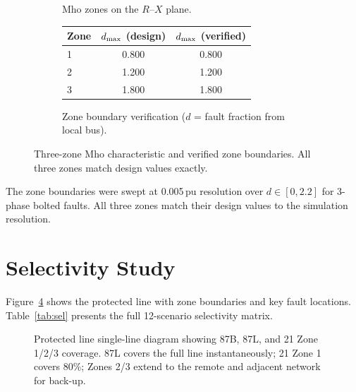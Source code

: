 \documentclass[11pt, a4paper]{article}
\begin{document}
\begin{figure}[ht]
  \centering
  \begin{subfigure}[b]{0.52\textwidth}
    \centering
    
    \caption{Mho zones on the $R$--$X$ plane.}
    \label{fig:rxplane}
  \end{subfigure}
  \hfill
  \begin{subfigure}[b]{0.45\textwidth}
    \centering
    \vspace{10pt}
    \begin{tabular}{lcc}
      \toprule
      Zone & $d_{\rm max}$ (design) & $d_{\rm max}$ (verified) \\
      \midrule
      1 & 0.800 & 0.800 \\
      2 & 1.200 & 1.200 \\
      3 & 1.800 & 1.800 \\
      \bottomrule
    \end{tabular}
    \vspace{6pt}
    \caption{Zone boundary verification ($d$ = fault fraction from local bus).}
    \label{tab:zones}
  \end{subfigure}
  \caption{Three-zone Mho characteristic and verified zone boundaries.
           All three zones match design values exactly.}
\end{figure}

The zone boundaries were swept at 0.005\,pu resolution over
$d \in [0, 2.2]$ for 3-phase bolted faults.  All three zones match
their design values to the simulation resolution.


\section{Selectivity Study}
\label{sec:selectivity}

Figure~\ref{fig:zones} shows the protected line with zone boundaries and
key fault locations.  Table~\ref{tab:sel} presents the full 12-scenario
selectivity matrix.

\begin{figure}[h]
  \centering
  
  \caption{Protected line single-line diagram showing 87B, 87L, and
           21 Zone 1/2/3 coverage.  87L covers the full line instantaneously;
           21 Zone 1 covers 80\%; Zones 2/3 extend to the remote and
           adjacent network for back-up.}
  \label{fig:zones}
\end{figure}
\end{document}
